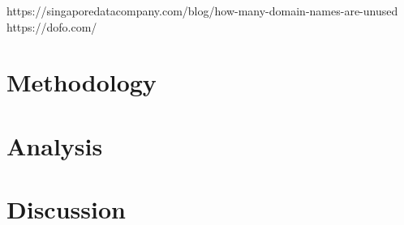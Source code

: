 \documentclass{idc_msc}
\begin{document}
https://singaporedatacompany.com/blog/how-many-domain-names-are-unused
https://dofo.com/


\section{Methodology}


\section{Analysis}


\section{Discussion}

\end{document}
